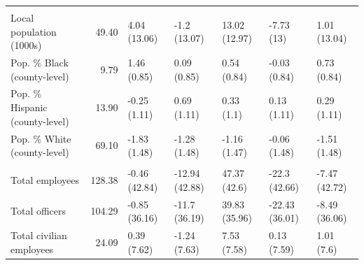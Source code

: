 \begin{table}
\begin{tabular}[t]{lrlllll}
\addlinespace[0.3em]
\multicolumn{7}{l}{\textbf{Population}}\\
\hspace{1em}Local population (1000s) & 49.40 & 4.04 (13.06) & -1.2 (13.07) & 13.02 (12.97) & -7.73 (13) & 1.01 (13.04)\\
\hspace{1em}Pop. \% Black (county-level) & 9.79 & 1.46 (0.85) & 0.09 (0.85) & 0.54 (0.84) & -0.03 (0.84) & 0.73 (0.84)\\
\hspace{1em}Pop. \% Hispanic (county-level) & 13.90 & -0.25 (1.11) & 0.69 (1.11) & 0.33 (1.1) & 0.13 (1.11) & 0.29 (1.11)\\
\hspace{1em}Pop. \% White (county-level) & 69.10 & -1.83 (1.48) & -1.28 (1.48) & -1.16 (1.47) & -0.06 (1.48) & -1.51 (1.48)\\
\addlinespace[0.3em]
\multicolumn{7}{l}{\textbf{Department size (\# of employees)}}\\
\hspace{1em}Total employees & 128.38 & -0.46 (42.84) & -12.94 (42.88) & 47.37 (42.6) & -22.3 (42.66) & -7.47 (42.72)\\
\hspace{1em}Total officers & 104.29 & -0.85 (36.16) & -11.7 (36.19) & 39.83 (35.96) & -22.43 (36.01) & -8.49 (36.06)\\
\hspace{1em}Total civilian employees & 24.09 & 0.39 (7.62) & -1.24 (7.63) & 7.53 (7.58) & 0.13 (7.59) & 1.01 (7.6)\\
\bottomrule
\end{tabular}
\end{table}
